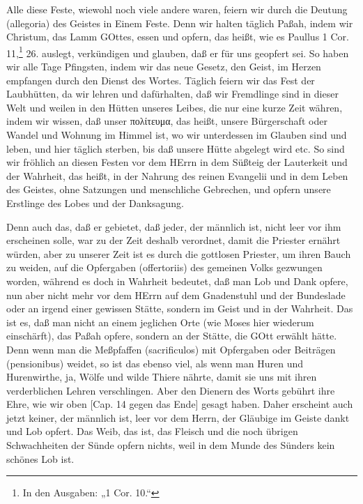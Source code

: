 Alle diese Feste, wiewohl noch viele andere waren, feiern wir durch die Deutung (allegoria) des Geistes in Einem Feste. Denn wir halten täglich Paßah, indem wir Christum, das Lamm GOttes, essen und opfern, das heißt, wie es Paullus 1 Cor. 11,\footnote{In den Ausgaben: „1 Cor. 10.“} 26. auslegt, verkündigen und glauben, daß er für uns geopfert sei. So haben wir alle Tage Pfingsten, indem wir das neue Gesetz, den Geist, im Herzen empfangen durch den Dienst des Wortes. Täglich feiern wir das Fest der Laubhütten, da wir lehren und dafürhalten, daß wir Fremdlinge sind in dieser Welt und weilen in den Hütten unseres Leibes, die nur eine kurze Zeit währen, indem wir wissen, daß unser πολίτευμα, das heißt, unsere Bürgerschaft oder Wandel und Wohnung im Himmel ist, wo wir unterdessen im Glauben sind und leben, und hier täglich sterben, bis daß unsere Hütte abgelegt wird etc. So sind wir fröhlich an diesen Festen vor dem HErrn in dem Süßteig der Lauterkeit und der Wahrheit, das heißt, in der Nahrung des reinen Evangelii und in dem Leben des Geistes, ohne Satzungen und menschliche Gebrechen, und opfern unsere Erstlinge des Lobes und der Danksagung.

Denn auch das, daß er gebietet, daß jeder, der männlich ist, nicht leer vor ihm erscheinen solle, war zu der Zeit deshalb verordnet, damit die Priester ernährt würden, aber zu unserer Zeit ist es durch die gottlosen Priester, um ihren Bauch zu weiden, auf die Opfergaben (offertoriis) des gemeinen Volks gezwungen worden, während es doch in Wahrheit bedeutet, daß man Lob und Dank opfere, nun aber nicht mehr vor dem HErrn auf dem Gnadenstuhl und der Bundeslade oder an irgend einer gewissen Stätte, sondern im Geist und in der Wahrheit. Das ist es, daß man nicht an einem jeglichen Orte (wie Moses hier wiederum einschärft), das Paßah opfere, sondern an der Stätte, die GOtt erwählt hätte. Denn wenn man die Meßpfaffen (sacrificulos) mit Opfergaben oder Beiträgen (pensionibus) weidet, so ist das ebenso viel, als wenn man Huren und Hurenwirthe, ja, Wölfe und wilde Thiere nährte, damit sie uns mit ihren verderblichen Lehren verschlingen. Aber den Dienern des Worts gebührt ihre Ehre, wie wir oben [Cap. 14 gegen das Ende] gesagt haben. Daher erscheint auch jetzt keiner, der männlich ist, leer vor dem Herrn, der Gläubige im Geiste dankt und Lob opfert. Das Weib, das ist, das Fleisch und die noch übrigen Schwachheiten der Sünde opfern nichts, weil in dem Munde des Sünders kein schönes Lob ist.

